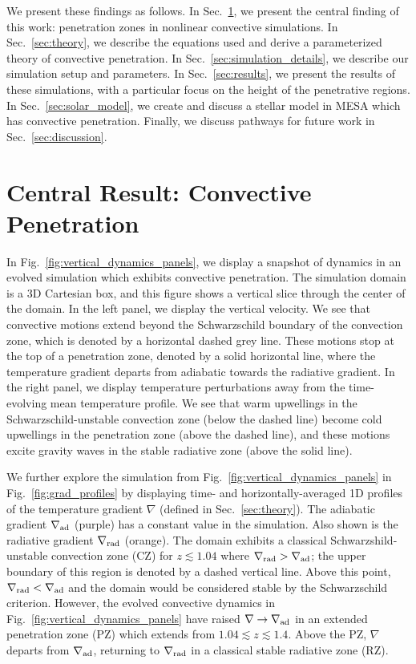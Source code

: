 \documentclass[twocolumn]{aastex631}
\newcommand{\gradrad}{\ensuremath{\nabla_{\rm{rad}}}}
\newcommand{\gradad}{\ensuremath{\nabla_{\rm{ad}}}}
\newcommand{\justgrad}{\ensuremath{\nabla}}
\begin{document}
We present these findings as follows.
In Sec.~\ref{sec:central_results}, we present the central finding of this work: penetration zones in nonlinear convective simulations.
In Sec.~\ref{sec:theory}, we describe the equations used and derive a parameterized theory of convective penetration.
In Sec.~\ref{sec:simulation_details}, we describe our simulation setup and parameters.
In Sec.~\ref{sec:results}, we present the results of these simulations, with a particular focus on the height of the penetrative regions.
In Sec.~\ref{sec:solar_model}, we create and discuss a stellar model in MESA which has convective penetration.
Finally, we discuss pathways for future work in Sec.~\ref{sec:discussion}.

\section{Central Result: Convective Penetration}
\label{sec:central_results}

In Fig.~\ref{fig:vertical_dynamics_panels}, we display a snapshot of dynamics in an evolved simulation which exhibits convective penetration.
The simulation domain is a 3D Cartesian box, and this figure shows a vertical slice through the center of the domain.
In the left panel, we display the vertical velocity.
We see that convective motions extend beyond the Schwarzschild boundary of the convection zone, which is denoted by a horizontal dashed grey line.
These motions stop at the top of a penetration zone, denoted by a solid horizontal line, where the temperature gradient departs from adiabatic towards the radiative gradient.
In the right panel, we display temperature perturbations away from the time-evolving mean temperature profile.
We see that warm upwellings in the Schwarzschild-unstable convection zone (below the dashed line) become cold upwellings in the penetration zone (above the dashed line), and these motions excite gravity waves in the stable radiative zone (above the solid line).

We further explore the simulation from Fig.~\ref{fig:vertical_dynamics_panels} in Fig.~\ref{fig:grad_profiles} by displaying time- and horizontally-averaged 1D profiles of the temperature gradient $\justgrad$ (defined in Sec.~\ref{sec:theory}).
The adiabatic gradient $\gradad$ (purple) has a constant value in the simulation.
Also shown is the radiative gradient $\gradrad$ (orange).
The domain exhibits a classical Schwarzshild-unstable convection zone (CZ) for $z \lesssim 1.04$ where $\gradrad > \gradad$; the upper boundary of this region is denoted by a dashed vertical line.
Above this point, $\gradrad < \gradad$ and the domain would be considered stable by the Schwarzschild criterion.
However, the evolved convective dynamics in Fig.~\ref{fig:vertical_dynamics_panels} have raised $\justgrad \rightarrow \gradad$ in an extended penetration zone (PZ) which extends from $1.04 \lesssim z \lesssim 1.4$.
Above the PZ, $\justgrad$ departs from $\gradad$, returning to $\gradrad$ in a classical stable radiative zone (RZ).
\end{document}
